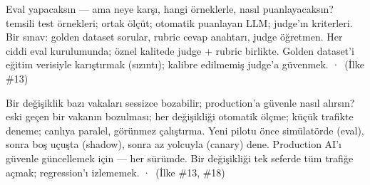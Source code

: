 
 Eval yapacaksın --- ama neye karşı, hangi örneklerle, nasıl puanlayacaksın?
  temsili test örnekleri;  ortak
ölçüt;  otomatik puanlayan LLM;  judge'ın kriterleri.
 Bir sınav: golden dataset sorular, rubric cevap anahtarı, judge öğretmen.
 Her ciddi eval kurulumunda; öznel kalitede judge + rubric birlikte.
 Golden dataset'i eğitim verisiyle karıştırmak (sızıntı); kalibre edilmemiş judge'a güvenmek.
  ·  \,{\scriptsize\color{softgray}(İlke \#13)}

 Bir değişiklik bazı vakaları sessizce bozabilir; production'a güvenle nasıl alırsın?
  eski geçen bir vakanın bozulması;  her değişikliği otomatik ölçme;  küçük trafikte deneme;
 canlıya paralel, görünmez çalıştırma.
 Yeni pilotu önce simülatörde (eval), sonra boş uçuşta (shadow), sonra az yolcuyla (canary) dene.
 Production AI'ı güvenle güncellemek için --- her sürümde.
 Bir değişikliği tek seferde tüm trafiğe açmak; regression'ı izlememek.
  ·  \,{\scriptsize\color{softgray}(İlke \#13, \#18)}

